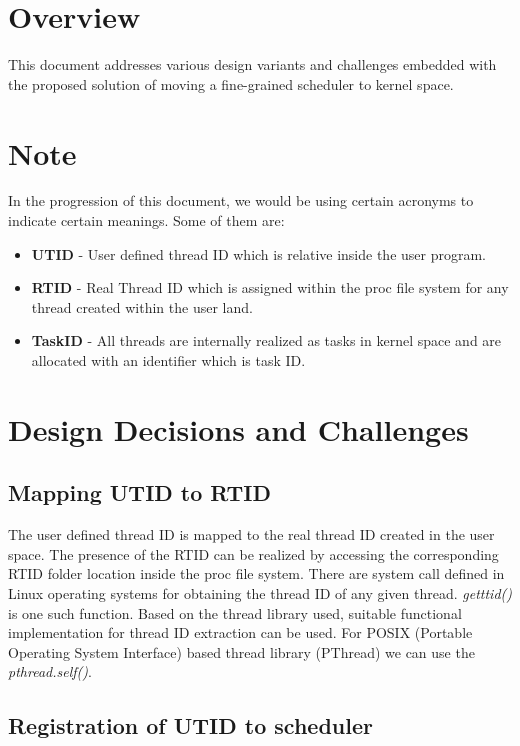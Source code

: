 
\section{Overview}

This document addresses various design variants and challenges embedded with the proposed solution of moving a fine-grained scheduler to kernel space. 

\section*{Note}
In the progression of this document, we would be using certain acronyms to indicate certain meanings. 
Some of them are:
\begin{itemize}
\item \textbf{UTID} - User defined thread ID which is relative inside the user program. 
\item \textbf{RTID} - Real Thread ID which is assigned within the proc file system for any thread created within the user land. 
\item \textbf{TaskID} - All threads are internally realized as tasks in kernel space and are allocated with an identifier which is task ID.
\end{itemize}

\section{Design Decisions and Challenges}

\subsection{Mapping UTID to RTID}

The user defined thread ID is mapped to the real thread ID created in the user space. 
The presence of the RTID can be realized by accessing the corresponding RTID folder location inside the proc file system. 
There are system call defined in Linux operating systems for obtaining the thread ID of any given thread. 
\emph{getttid()} is one such function. 
Based on the thread library used, suitable functional implementation for thread ID extraction can be used. 
For POSIX (Portable Operating System Interface) based thread library (PThread) we can use the \emph{pthread.self()}.

\subsection{Registration of UTID to scheduler}

